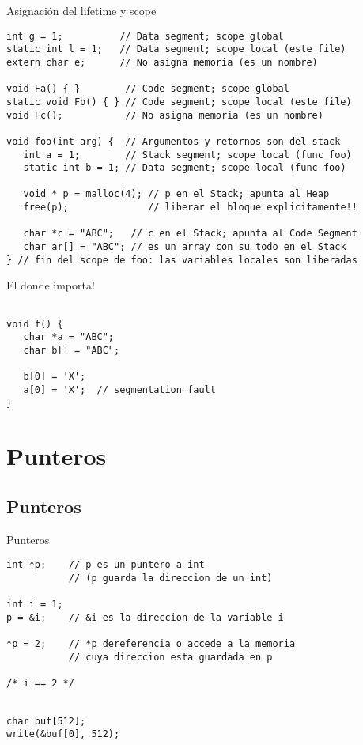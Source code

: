 \begin{frame}[fragile]{Asignaci\'on del lifetime y scope}
         \begin{lstlisting}[style=normal]
int g = 1;          // Data segment; scope global
static int l = 1;   // Data segment; scope local (este file)
extern char e;      // No asigna memoria (es un nombre)

void Fa() { }        // Code segment; scope global
static void Fb() { } // Code segment; scope local (este file)
void Fc();           // No asigna memoria (es un nombre)

void foo(int arg) {  // Argumentos y retornos son del stack
   int a = 1;        // Stack segment; scope local (func foo)
   static int b = 1; // Data segment; scope local (func foo)

   void * p = malloc(4); // p en el Stack; apunta al Heap
   free(p);              // liberar el bloque explicitamente!!

   char *c = "ABC";   // c en el Stack; apunta al Code Segment
   char ar[] = "ABC"; // es un array con su todo en el Stack
} // fin del scope de foo: las variables locales son liberadas
         \end{lstlisting}
\end{frame}
\begin{frame}[fragile]{El donde importa!}
         \begin{lstlisting}[style=normal]

void f() {
   char *a = "ABC";
   char b[] = "ABC";

   b[0] = 'X';
   a[0] = 'X';  // segmentation fault
}
         \end{lstlisting}
\end{frame}

\section{Punteros}
\subsection{Punteros}
\begin{frame}[fragile]{Punteros}
         \begin{lstlisting}[style=normal]
int *p;    // p es un puntero a int
           // (p guarda la direccion de un int)

int i = 1;
p = &i;    // &i es la direccion de la variable i

*p = 2;    // *p dereferencia o accede a la memoria
           // cuya direccion esta guardada en p

/* i == 2 */

         \end{lstlisting}
         \begin{lstlisting}[style=normal]

char buf[512];
write(&buf[0], 512);

         \end{lstlisting}
\end{frame}

